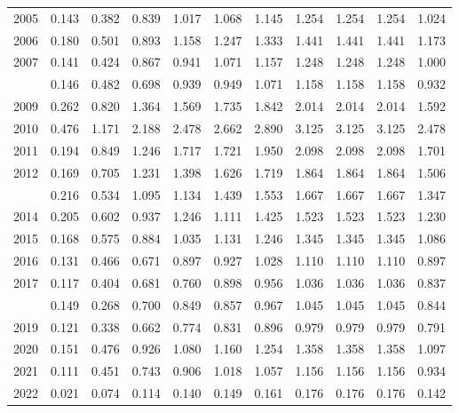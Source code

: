 \documentclass[
]{article}
\begin{document}
\begin{longtable}[t]{lrrrrrrrrrr}
2005 & 0.143 & 0.382 & 0.839 & 1.017 & 1.068 & 1.145 & 1.254 & 1.254 & 1.254 & 1.024\\
2006 & 0.180 & 0.501 & 0.893 & 1.158 & 1.247 & 1.333 & 1.441 & 1.441 & 1.441 & 1.173\\
2007 & 0.141 & 0.424 & 0.867 & 0.941 & 1.071 & 1.157 & 1.248 & 1.248 & 1.248 & 1.000\\
\addlinespace
2008 & 0.146 & 0.482 & 0.698 & 0.939 & 0.949 & 1.071 & 1.158 & 1.158 & 1.158 & 0.932\\
2009 & 0.262 & 0.820 & 1.364 & 1.569 & 1.735 & 1.842 & 2.014 & 2.014 & 2.014 & 1.592\\
2010 & 0.476 & 1.171 & 2.188 & 2.478 & 2.662 & 2.890 & 3.125 & 3.125 & 3.125 & 2.478\\
2011 & 0.194 & 0.849 & 1.246 & 1.717 & 1.721 & 1.950 & 2.098 & 2.098 & 2.098 & 1.701\\
2012 & 0.169 & 0.705 & 1.231 & 1.398 & 1.626 & 1.719 & 1.864 & 1.864 & 1.864 & 1.506\\
\addlinespace
2013 & 0.216 & 0.534 & 1.095 & 1.134 & 1.439 & 1.553 & 1.667 & 1.667 & 1.667 & 1.347\\
2014 & 0.205 & 0.602 & 0.937 & 1.246 & 1.111 & 1.425 & 1.523 & 1.523 & 1.523 & 1.230\\
2015 & 0.168 & 0.575 & 0.884 & 1.035 & 1.131 & 1.246 & 1.345 & 1.345 & 1.345 & 1.086\\
2016 & 0.131 & 0.466 & 0.671 & 0.897 & 0.927 & 1.028 & 1.110 & 1.110 & 1.110 & 0.897\\
2017 & 0.117 & 0.404 & 0.681 & 0.760 & 0.898 & 0.956 & 1.036 & 1.036 & 1.036 & 0.837\\
\addlinespace
2018 & 0.149 & 0.268 & 0.700 & 0.849 & 0.857 & 0.967 & 1.045 & 1.045 & 1.045 & 0.844\\
2019 & 0.121 & 0.338 & 0.662 & 0.774 & 0.831 & 0.896 & 0.979 & 0.979 & 0.979 & 0.791\\
2020 & 0.151 & 0.476 & 0.926 & 1.080 & 1.160 & 1.254 & 1.358 & 1.358 & 1.358 & 1.097\\
2021 & 0.111 & 0.451 & 0.743 & 0.906 & 1.018 & 1.057 & 1.156 & 1.156 & 1.156 & 0.934\\
2022 & 0.021 & 0.074 & 0.114 & 0.140 & 0.149 & 0.161 & 0.176 & 0.176 & 0.176 & 0.142\\*
\end{longtable}
\end{document}
